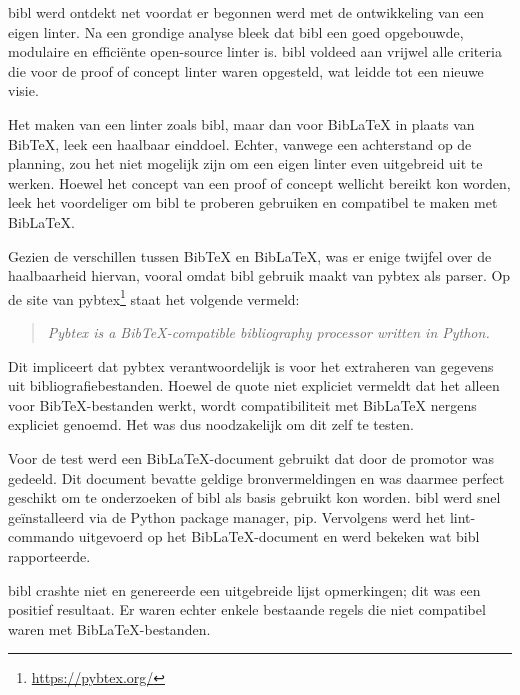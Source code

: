 bibl werd ontdekt net voordat er begonnen werd met de ontwikkeling van een eigen linter. Na een grondige analyse bleek dat bibl een goed opgebouwde, modulaire en efficiënte open-source linter is. bibl voldeed aan vrijwel alle criteria die voor de proof of concept linter waren opgesteld, wat leidde tot een nieuwe visie.

Het maken van een linter zoals bibl, maar dan voor BibLaTeX in plaats van BibTeX, leek een haalbaar einddoel. Echter, vanwege een achterstand op de planning, zou het niet mogelijk zijn om een eigen linter even uitgebreid uit te werken. Hoewel het concept van een proof of concept wellicht bereikt kon worden, leek het voordeliger om bibl te proberen gebruiken en compatibel te maken met BibLaTeX.

Gezien de verschillen tussen BibTeX en BibLaTeX, was er enige twijfel over de haalbaarheid hiervan, vooral omdat bibl gebruik maakt van pybtex als parser. Op de site van pybtex\footnote{\url{https://pybtex.org/}} staat het volgende vermeld:

\begin{quote}\emph{Pybtex is a BibTeX-compatible bibliography processor written in Python.}\end{quote}

Dit impliceert dat pybtex verantwoordelijk is voor het extraheren van gegevens uit bibliografiebestanden. Hoewel de quote niet expliciet vermeldt dat het alleen voor BibTeX-bestanden werkt, wordt compatibiliteit met BibLaTeX nergens expliciet genoemd. Het was dus noodzakelijk om dit zelf te testen.

Voor de test werd een BibLaTeX-document gebruikt dat door de promotor was gedeeld. Dit document bevatte geldige bronvermeldingen en was daarmee perfect geschikt om te onderzoeken of bibl als basis gebruikt kon worden. bibl werd snel geïnstalleerd via de Python package manager, pip. Vervolgens werd het lint-commando uitgevoerd op het BibLaTeX-document en werd bekeken wat bibl rapporteerde.

bibl crashte niet en genereerde een uitgebreide lijst opmerkingen; dit was een positief resultaat. Er waren echter enkele bestaande regels die niet compatibel waren met BibLaTeX-bestanden.

